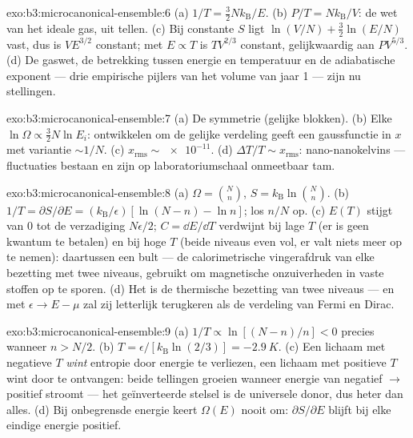 \begin{solution}{exo:b3:microcanonical-ensemble:6}
(a) $1/T = \tfrac32 Nk_{\text{B}}/E$. (b) $P/T =
Nk_{\text{B}}/V$: de wet
van het ideale gas, uit tellen. (c) Bij constante $S$ ligt $\ln(V/N) + \tfrac32\ln(E/N)$ vast, dus is $VE^{3/2}$ constant; met $E \propto T$ is
$TV^{2/3}$ constant, gelijkwaardig aan $PV^{5/3}$. (d) De gaswet, de
betrekking tussen energie en temperatuur en de adiabatische exponent ---
drie empirische pijlers van het volume van jaar 1 --- zijn nu stellingen.
\end{solution}

\begin{solution}{exo:b3:microcanonical-ensemble:7}
(a) De symmetrie (gelijke blokken). (b) Elke $\ln\Omega \propto
\tfrac32 N\ln E_i$: ontwikkelen om de gelijke verdeling geeft een
gaussfunctie in $x$ met variantie $\sim1/N$. (c) $x_{\text{rms}} \sim
\num{e-11}$. (d) $\Delta T/T \sim x_{\text{rms}}$: nano-nanokelvins ---
fluctuaties bestaan en zijn op laboratoriumschaal onmeetbaar tam.
\end{solution}

\begin{solution}{exo:b3:microcanonical-ensemble:8}
(a) $\Omega = \binom Nn$, $S = k_{\text{B}}\ln\binom Nn$. (b)
$1/T = \partial S/\partial E = (k_{\text{B}}/\epsilon)[\ln(N-n) -
\ln n]$; los $n/N$ op. (c) $E(T)$ stijgt van $0$ tot de verzadiging
$N\epsilon/2$; $C = \dd E/\dd T$ verdwijnt bij lage $T$ (er is geen kwantum
te betalen) en bij hoge $T$ (beide niveaus even vol, er valt niets meer op
te nemen): daartussen een bult --- de calorimetrische vingerafdruk van elke
bezetting met twee niveaus, gebruikt om magnetische onzuiverheden in vaste
stoffen op te sporen. (d) Het is de thermische bezetting van twee niveaus
--- en met $\epsilon \to E - \mu$ zal zij letterlijk terugkeren als de
verdeling van Fermi en Dirac.
\end{solution}

\begin{solution}{exo:b3:microcanonical-ensemble:9}
(a) $1/T \propto \ln[(N-n)/n] < 0$ precies wanneer $n > N/2$. (b)
$T = \epsilon/[k_{\text{B}}\ln(2/3)] = -\qty{2.9}{K}$. (c) Een lichaam met
negatieve $T$ \emph{wint} entropie door energie te verliezen, een lichaam
met positieve $T$ wint door te ontvangen: beide tellingen groeien wanneer
energie van negatief $\to$ positief stroomt --- het geïnverteerde stelsel is
de universele donor, dus heter dan alles. (d) Bij onbegrensde energie keert
$\Omega(E)$ nooit om: $\partial S/\partial E$ blijft bij elke eindige
energie positief.
\end{solution}

